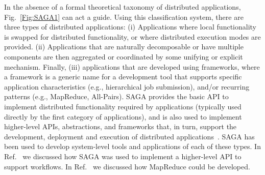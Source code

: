 \documentclass{rspublic}
\begin{document}
In the absence of a formal theoretical taxonomy of distributed
applications, Fig.~\ref{Fig:SAGA1} can act a guide. Using this
classification system, there are three types of distributed
applications: (i) Applications where local functionality is swapped
for distributed functionality, or where distributed execution modes
are provided. %
(ii) Applications that are naturally decomposable or have multiple
components are then aggregated or coordinated by some unifying or
explicit mechanism. %
Finally, (iii) applications that are developed using frameworks, where
a framework is a generic name for a development tool that supports
specific application characteristics (e.g., hierarchical job
submission), and/or recurring patterns (e.g., MapReduce, All-Pairs).
SAGA provides the basic API to implement distributed functionality
required by applications (typically used directly by the first
category of applications), and is also used to implement higher-level
APIs, abstractions, and frameworks that, in turn, support the
development, deployment and execution of distributed
applications~\cite{saga_gmac09}. SAGA has been used to develop
system-level tools and applications of each of these types. In
Ref.~\cite{saga_montage_escience09} we discussed how SAGA was used to
implement a higher-level API to support workflows. In
Ref.~\cite{saga_ccgrid09} we discussed how MapReduce could be
developed.


\end{document}
